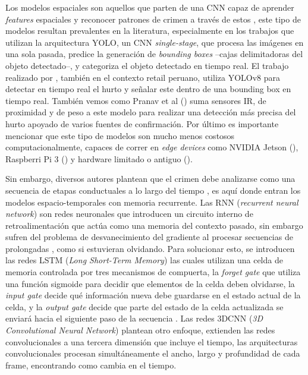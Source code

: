 Los modelos espaciales son aquellos que parten de una CNN capaz de aprender \textit{features} espaciales y
reconocer patrones de crimen a través de estos \cite{anikwe-onyiwa_recent_2025}, este tipo de modelos resultan prevalentes en la
literatura, especialmente en los trabajos que utilizan la arquitectura YOLO, un CNN \textit{single-stage}, que
procesa las imágenes en una sola pasada, predice la generación de \textit{bounding boxes} --cajas delimitadoras del
objeto detectado--, y categoriza el objeto detectado en tiempo real. El trabajo realizado por \cite{aguero_intelligent_2025}, también
en el contexto retail peruano, utiliza YOLOv8 para detectar en tiempo real el hurto y señalar este dentro de una
bounding box en tiempo real. También vemos como Pranav et al (\cite{m_deep_2023}) suma sensores IR, de proximidad y de
peso a este modelo para realizar una detección más precisa del hurto apoyado de varios fuentes de confirmación. Por
último es importante mencionar que este tipo de modelos son mucho menos costosos computacionalmente, capaces de correr
en \textit{edge devices} como NVIDIA Jetson (\cite{hameed_real_2025}), Raspberri Pi 3 (\cite{m_deep_2023}) y hardware limitado
o antiguo (\cite{aguero_intelligent_2025}).

Sin embargo, diversos autores plantean que el crimen debe analizarse como una secuencia de etapas conductuales a lo largo
del tiempo \cite{martinez-mascorro_suspicious_2021}, es aquí donde entran los modelos espacio-temporales con memoria recurrente. Las RNN (\textit{recurrent neural network})
son redes neuronales que introducen un circuito interno de retroalimentación que actúa como una memoria del contexto pasado,
sin embargo sufren del problema de desvanecimiento del gradiente al procesar secuencias de prolongadas \cite{anikwe-onyiwa_recent_2025}, como si estuvieran olvidando. Para
solucionar esto, se introducen las redes LSTM (\textit{Long Short-Term Memory}) las cuales utilizan una celda de memoria controlada
por tres mecanismos de compuerta, la \textit{forget gate} que utiliza una función sigmoide para decidir que elementos de la celda
deben olvidarse, la \textit{input gate} decide qué información nueva debe guardarse en el estado actual de la celda, y la
\textit{output gate} decide que parte del estado de la celda actualizada se enviará hacia el siguiente paso de la secuencia \cite{ansari_optimized_2023, anikwe-onyiwa_recent_2025}. Las redes
3DCNN (\textit{3D Convolutional Neural Network}) plantean otro enfoque, extienden las redes convolucionales a una tercera dimensión que
incluye el tiempo, las arquitecturas convolucionales procesan simultáneamente el ancho, largo y profundidad de cada frame, encontrando
como cambia en el tiempo.

